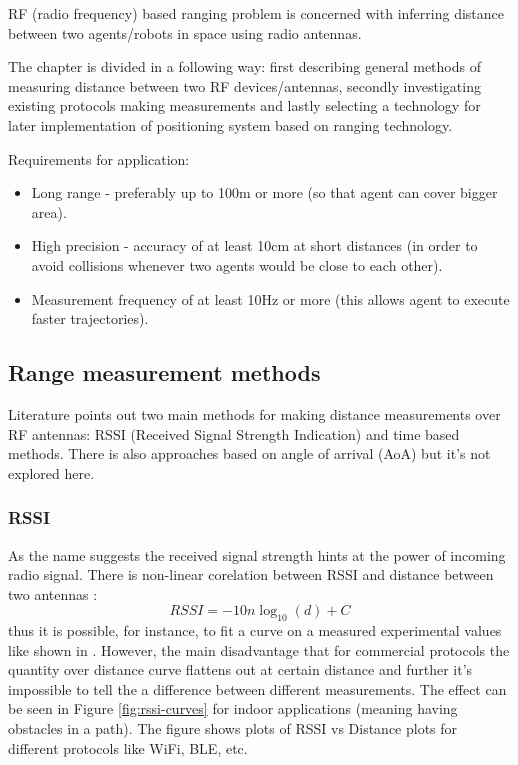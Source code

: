 RF (radio frequency) based ranging problem is concerned with inferring distance between two agents/robots in space using radio antennas.

The chapter is divided in a following way: first describing general methods of measuring distance between two RF devices/antennas, secondly investigating existing protocols making measurements and lastly selecting a technology for later implementation of positioning system based on ranging technology.

Requirements for application:
\begin{itemize}
    \item Long range - preferably up to 100m or more (so that agent can cover bigger area).
    \item High precision - accuracy of at least 10cm at short distances (in order to avoid collisions whenever two agents would be close to each other).
    \item Measurement frequency of at least 10Hz or more (this allows agent to execute faster trajectories).
\end{itemize}

\subsection{Range measurement methods}

Literature points out two main methods for making distance measurements over RF antennas: RSSI (Received Signal Strength Indication) and time based methods. There is also approaches based on angle of arrival (AoA) but it's not explored here.

\subsubsection{RSSI}

As the name suggests the received signal strength hints at the power of incoming radio signal. There is non-linear corelation between RSSI and distance between two antennas \cite{rssi-curves}:
$$
    R S S I=-10 n \log _{10}(d)+C
$$
thus it is possible, for instance, to fit a curve on a measured experimental values like shown in \cite{rssi-curves}. However, the main disadvantage that for commercial protocols the quantity over distance curve flattens out at certain distance and further it's impossible to tell the a difference between different measurements. The effect can be seen in Figure \ref{fig:rssi-curves} for indoor applications (meaning having obstacles in a path). The figure shows plots of RSSI vs Distance plots for different protocols like WiFi, BLE, etc.

